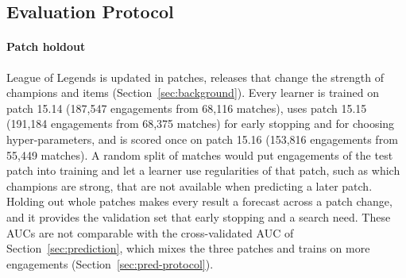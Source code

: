 \subsection{Evaluation Protocol}
\label{sec:learners-protocol}

\paragraph{Patch holdout}
League of Legends is updated in patches, releases that change the strength of champions and items
(Section~\ref{sec:background}). Every learner is trained on patch 15.14 (187,547 engagements from 68,116
matches), uses patch 15.15 (191,184 engagements from 68,375 matches) for early stopping and for choosing
hyper-parameters, and is scored once on patch 15.16 (153,816 engagements from 55,449 matches). A random
split of matches would put engagements of the test patch into training and let a learner use regularities
of that patch, such as which champions are strong, that are not available when predicting a later patch.
Holding out whole patches makes every result a forecast across a patch change, and it provides the
validation set that early stopping and a search need. These AUCs are not comparable with the
cross-validated AUC of Section~\ref{sec:prediction}, which mixes the three patches and trains on more
engagements (Section~\ref{sec:pred-protocol}).


